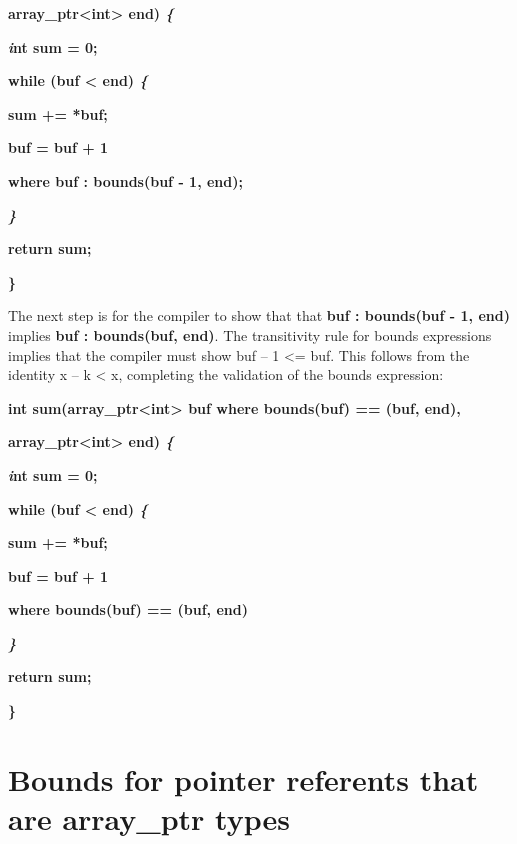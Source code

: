\documentclass[]{article}
\begin{document}
\textbf{array\_ptr\textless{}int\textgreater{} end) \emph{\{}}

\textbf{\emph{i}nt sum = 0;}

\textbf{while (buf \textless{} end) \emph{\{}}

\textbf{sum += *buf; }

\textbf{buf = buf + 1}

\textbf{where buf : bounds(buf - 1, end); }

\emph{\textbf{\}}}

\textbf{return sum;}

\textbf{\}}

The next step is for the compiler to show that that \textbf{buf :
bounds(buf - 1, end)} implies \textbf{buf : bounds(buf, end)}. The
transitivity rule for bounds expressions implies that the compiler must
show buf -- 1 \textless{}= buf. This follows from the identity x -- k
\textless{} x, completing the validation of the bounds expression:

\textbf{int sum(array\_ptr\textless{}int\textgreater{} buf where
bounds(buf) == (buf, end), }

\textbf{array\_ptr\textless{}int\textgreater{} end) \emph{\{}}

\textbf{\emph{i}nt sum = 0;}

\textbf{while (buf \textless{} end) \emph{\{}}

\textbf{sum += *buf; }

\textbf{buf = buf + 1}

\textbf{where bounds(buf) == (buf, end) }

\emph{\textbf{\}}}

\textbf{return sum;}

\textbf{\}}

\section{\texorpdfstring{\protect\hypertarget{ux5fRef420422573}{}{\protect\hypertarget{ux5fRef420422726}{}{\protect\hypertarget{ux5fRef420423017}{}{\protect\hypertarget{ux5fRef420423055}{}{\protect\hypertarget{ux5fRef420588060}{}{\protect\hypertarget{ux5fToc420589211}{}{\protect\hypertarget{ux5fToc422907002}{}{\protect\hypertarget{ux5fRef424291672}{}{\protect\hypertarget{ux5fToc424307731}{}{\protect\hypertarget{ux5fToc426641125}{}{\protect\hypertarget{ux5fToc435435000}{}{\protect\hypertarget{ux5fToc437460833}{}{\protect\hypertarget{ux5fToc440445514}{}{\protect\hypertarget{ux5fToc440449296}{}{\protect\hypertarget{ux5fToc440551946}{}{\protect\hypertarget{ux5fRef416273914}{}{}}}}}}}}}}}}}}}}Bounds
for pointer referents that are array\_ptr
types}{Bounds for pointer referents that are array\_ptr types}}\label{bounds-for-pointer-referents-that-are-arrayux5fptr-types}
\end{document}
